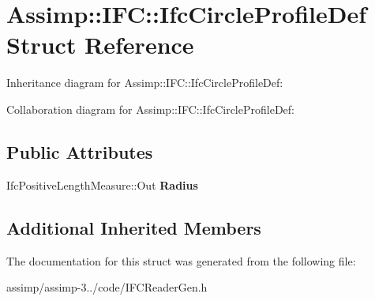 \hypertarget{struct_assimp_1_1_i_f_c_1_1_ifc_circle_profile_def}{\section{Assimp\+:\+:I\+F\+C\+:\+:Ifc\+Circle\+Profile\+Def Struct Reference}
\label{struct_assimp_1_1_i_f_c_1_1_ifc_circle_profile_def}
}


Inheritance diagram for Assimp\+:\+:I\+F\+C\+:\+:Ifc\+Circle\+Profile\+Def\+:


Collaboration diagram for Assimp\+:\+:I\+F\+C\+:\+:Ifc\+Circle\+Profile\+Def\+:
\subsection*{Public Attributes}
\begin{DoxyCompactItemize}
\item 
\hypertarget{struct_assimp_1_1_i_f_c_1_1_ifc_circle_profile_def_aefcb096422bca4e3992a0ee760682d57}{Ifc\+Positive\+Length\+Measure\+::\+Out {\bfseries Radius}}\label{struct_assimp_1_1_i_f_c_1_1_ifc_circle_profile_def_aefcb096422bca4e3992a0ee760682d57}

\end{DoxyCompactItemize}
\subsection*{Additional Inherited Members}


The documentation for this struct was generated from the following file\+:\begin{DoxyCompactItemize}
\item 
assimp/assimp-\/3../code/I\+F\+C\+Reader\+Gen.\+h\end{DoxyCompactItemize}
